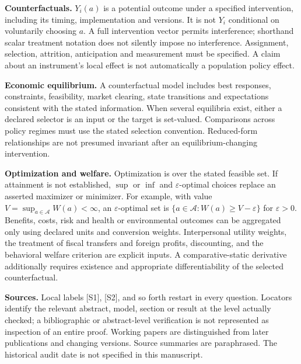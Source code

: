 \documentclass[11pt,a4paper]{article}
\begin{document}
\textbf{Counterfactuals.} $Y_i(a)$ is a potential outcome under a specified intervention, including its timing, implementation and versions. It is not $Y_i$ conditional on voluntarily choosing $a$. A full intervention vector permits interference; shorthand scalar treatment notation does not silently impose no interference. Assignment, selection, attrition, anticipation and measurement must be specified. A claim about an instrument's local effect is not automatically a population policy effect.

\textbf{Economic equilibrium.} A counterfactual model includes best responses, constraints, feasibility, market clearing, state transitions and expectations consistent with the stated information. When several equilibria exist, either a declared selector is an input or the target is set-valued. Comparisons across policy regimes must use the stated selection convention. Reduced-form relationships are not presumed invariant after an equilibrium-changing intervention.

\textbf{Optimization and welfare.} Optimization is over the stated feasible set. If attainment is not established, $\sup$ or $\inf$ and $\varepsilon$-optimal choices replace an asserted maximizer or minimizer. For example, with value $V=\sup_{a\in\mathcal A}W(a)<\infty$, an $\varepsilon$-optimal set is $\{a\in\mathcal A:W(a)\geq V-\varepsilon\}$ for $\varepsilon>0$. Benefits, costs, risk and health or environmental outcomes can be aggregated only using declared units and conversion weights. Interpersonal utility weights, the treatment of fiscal transfers and foreign profits, discounting, and the behavioral welfare criterion are explicit inputs. A comparative-static derivative additionally requires existence and appropriate differentiability of the selected counterfactual.

\textbf{Sources.} Local labels [S1], [S2], and so forth restart in every question. Locators identify the relevant abstract, model, section or result at the level actually checked; a bibliographic or abstract-level verification is not represented as inspection of an entire proof. Working papers are distinguished from later publications and changing versions. Source summaries are paraphrased. The historical audit date is not specified in this manuscript.
\end{document}

